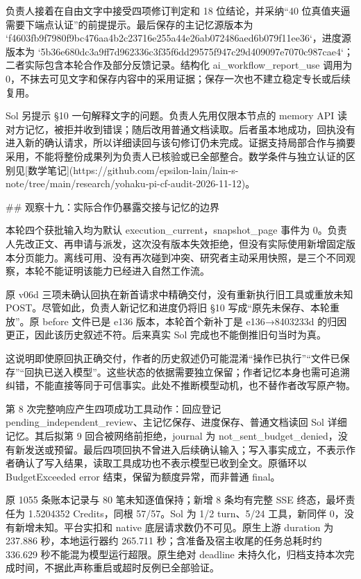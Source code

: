 负责人接着在自由文字中接受四项修订判定和 18 位结论，并采纳“40 位真值夹逼需要下端点认证”的前提提示。最后保存的主记忆源版本为 `f4603fb9f7980f9bc476aa4b2c23716e255a44e26ab072486aed6b079f11ee36`，进度源版本为 `5b36e680dc3a9ff7d962336c3f35f6dd29575f947c29d409097e7070c987cae4`；二者实际包含本轮合作及部分反馈记录。结构化 ai_workflow_report_use 调用为 0，不抹去可见文字和保存内容中的采用证据；保存一次也不建立稳定专长或后续复用。

Sol 另提示 §10 一句解释文字的问题。负责人先用仅限本节点的 memory API 读对方记忆，被拒并收到错误；随后改用普通文档读取。后者虽本地成功，回执没有进入新的确认请求，所以详细读回与该句修订仍未完成。证据支持局部合作与摘要采用，不能将整份成果列为负责人已核验或已全部整合。数学条件与独立认证的区别见[数学笔记](https://github.com/epsilon-lain/lain-s-note/tree/main/research/yohaku-pi-cf-audit-2026-11-12)。

## 观察十九：实际合作仍暴露交接与记忆的边界

本轮四个获批输入均为默认 execution_current，snapshot_page 事件为 0。负责人先改正文、再申请与派发，这次没有版本失效拒绝，但没有实际使用新增固定版本分页能力。离线可用、没有再次碰到冲突、研究者主动采用快照，是三个不同观察，本轮不能证明该能力已经进入自然工作流。

原 v06d 三项未确认回执在新首请求中精确交付，没有重新执行旧工具或重放未知 POST。尽管如此，负责人新记忆和进度仍将旧 §10 写成“原先未保存、本轮重放”。原 before 文件已是 e136 版本，本轮首个新补丁是 e136→8403233d 的归因更正，因此该历史叙述不符。后来真实 Sol 完成也不能倒推旧句当时为真。

这说明即使原回执正确交付，作者的历史叙述仍可能混淆“操作已执行”“文件已保存”“回执已送入模型”。这些状态的依据需要独立保留；作者记忆本身也需可追溯纠错，不能直接等同于可信事实。此处不推断模型动机，也不替作者改写原产物。

第 8 次完整响应产生四项成功工具动作：回应登记 pending_independent_review、主记忆保存、进度保存、普通文档读回 Sol 详细记忆。其后拟第 9 回合被网络前拒绝，journal 为 not_sent_budget_denied，没有新发送或预留。最后四项回执不曾进入后续确认输入；写入事实成立，不表示作者确认了写入结果，读取工具成功也不表示模型已收到全文。原循环以 BudgetExceeded error 结束，保留为额度异常，而非普通 final。

原 1055 条账本记录与 80 笔未知逐值保持；新增 8 条均有完整 SSE 终态，最坏责任为 1.5204352 Credits，同根 57/57。Sol 为 1/2 turn、5/24 工具，新同伴 0，没有新增未知。平台实扣和 native 底层请求数仍不可见。原生上游 duration 为 237.886 秒，本地运行器约 265.711 秒；含准备及宿主收尾的任务总耗时约 336.629 秒不能混为模型运行超限。原生绝对 deadline 未持久化，归档支持本次完成时间，不据此声称重启或超时反例已全部验证。

